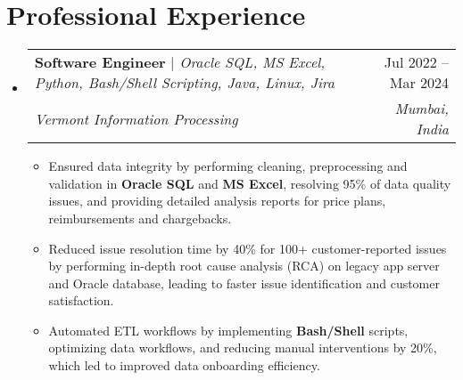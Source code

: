\documentclass[letterpaper,11pt]{article}
\makeatletter
\newcommand{\resumeItem}[1]{
  \item\small{
    {#1 \vspace{-2pt}}
  }
}
\newcommand{\resumeExperienceSubheading}[5]{
  \vspace{-2pt}\item
    \begin{tabular*}{0.97\textwidth}[t]{l@{\extracolsep{\fill}}r}
      \textbf{#1} \emph{\small#2} & #3 \\
      \textit{\small#4} & \textit{\small #5} \\
    \end{tabular*}\vspace{-7pt}
}
\newcommand{\resumeSubSubheading}[2]{
    \item
    \begin{tabular*}{0.97\textwidth}{l@{\extracolsep{\fill}}r}
      \textit{\small#1} & \textit{\small #2} \\
    \end{tabular*}\vspace{-7pt}
}
\newcommand{\resumeSubHeadingListStart}{\begin{itemize}[leftmargin=0.15in, label={}]}
\newcommand{\resumeSubHeadingListEnd}{\end{itemize}}
\newcommand{\resumeItemListStart}{\begin{itemize}}
\newcommand{\resumeItemListEnd}{\end{itemize}\vspace{-5pt}}
\makeatother
\begin{document}
\section{Professional Experience}
  \resumeSubHeadingListStart

    \resumeExperienceSubheading
      {Software Engineer}{$|$ Oracle SQL, MS Excel, Python, Bash/Shell Scripting, Java, Linux, Jira}{Jul 2022 -- Mar 2024}
      {Vermont Information Processing}{Mumbai, India}
      
      \resumeItemListStart
        \resumeItem{Ensured data integrity by performing cleaning, preprocessing and validation in \textbf{Oracle SQL} and \textbf{MS Excel}, resolving 95\% of data quality issues, and providing detailed analysis reports for price plans, reimbursements and chargebacks.}\vspace{-11pt}\resumeItem{Reduced issue resolution time by 40\% for 100+ customer-reported issues by performing in-depth root cause analysis (RCA) on legacy app server and Oracle database, leading to faster issue identification and customer satisfaction.}
        \resumeItem{Automated ETL workflows by implementing \textbf{Bash/Shell} scripts, optimizing data workflows, and reducing manual interventions by 20\%, which led to improved data onboarding efficiency.}
      \resumeItemListEnd
      

  \resumeSubHeadingListEnd


\end{document}
